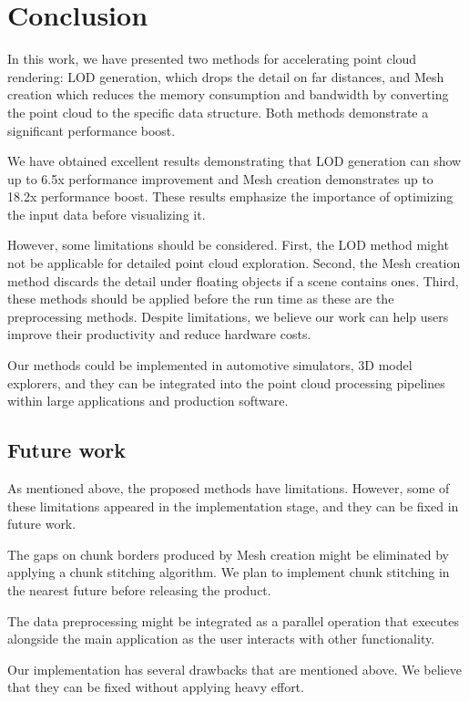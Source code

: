\chapter{Conclusion}
\label{chap:conclusion}

In this work, we have presented two methods for accelerating point cloud rendering: LOD generation, which drops the detail on far distances, and Mesh creation which reduces the memory consumption and bandwidth by converting the point cloud to the specific data structure. Both methods demonstrate a significant performance boost.

We have obtained excellent results demonstrating that LOD generation can show up to 6.5x performance improvement and Mesh creation demonstrates up to 18.2x performance boost. These results emphasize the importance of optimizing the input data before visualizing it.

However, some limitations should be considered. First, the LOD method might not be applicable for detailed point cloud exploration. Second, the Mesh creation method discards the detail under floating objects if a scene contains ones. Third, these methods should be applied before the run time as these are the preprocessing methods. Despite limitations, we believe our work can help users improve their productivity and reduce hardware costs.

Our methods could be implemented in automotive simulators, 3D model explorers, and they can be integrated into the point cloud processing pipelines within large applications and production software.

\section{Future work}

As mentioned above, the proposed methods have limitations. However, some of these limitations appeared in the implementation stage, and they can be fixed in future work.

The gaps on chunk borders produced by Mesh creation might be eliminated by applying a chunk stitching algorithm. We plan to implement chunk stitching in the nearest future before releasing the product.

The data preprocessing might be integrated as a parallel operation that executes alongside the main application as the user interacts with other functionality.

Our implementation has several drawbacks that are mentioned above. We believe that they can be fixed without applying heavy effort.